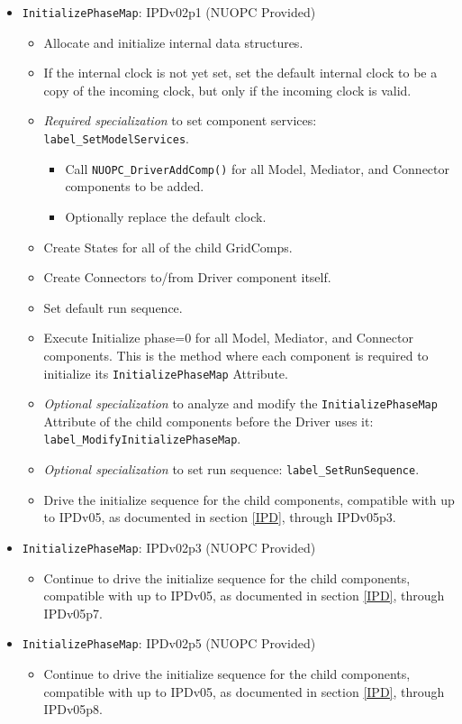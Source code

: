 \begin{itemize}
\item {\tt InitializePhaseMap}: IPDv02p1 ({\sc NUOPC Provided})
  \begin{itemize}
  \item Allocate and initialize internal data structures.
  \item If the internal clock is not yet set, set the default internal clock to be a copy of the incoming clock, but only if the incoming clock is valid.
  \item {\it Required specialization} to set component services: {\tt label\_SetModelServices}.
  \begin{itemize}
    \item Call {\tt NUOPC\_DriverAddComp()} for all Model, Mediator, and Connector components to be added.
    \item Optionally replace the default clock. 
  \end{itemize}
  \item Create States for all of the child GridComps.
  \item Create Connectors to/from Driver component itself.
  \item Set default run sequence.
  \item Execute Initialize phase=0 for all Model, Mediator, and Connector components. This is the method where each component is required to initialize its {\tt InitializePhaseMap} Attribute.
  \item {\it Optional specialization} to analyze and modify the {\tt InitializePhaseMap} Attribute of the child components before the Driver uses it: {\tt label\_ModifyInitializePhaseMap}.
  \item {\it Optional specialization} to set run sequence: {\tt label\_SetRunSequence}.
  \item Drive the initialize sequence for the child components, compatible with up to IPDv05, as documented in section \ref{IPD}, through IPDv05p3.
  \end{itemize}  

\item {\tt InitializePhaseMap}: IPDv02p3 ({\sc NUOPC Provided})
  \begin{itemize}
  \item Continue to drive the initialize sequence for the child components, compatible with up to IPDv05, as documented in section \ref{IPD}, through IPDv05p7.
  \end{itemize}  

\item {\tt InitializePhaseMap}: IPDv02p5 ({\sc NUOPC Provided})
  \begin{itemize}
  \item Continue to drive the initialize sequence for the child components, compatible with up to IPDv05, as documented in section \ref{IPD}, through IPDv05p8.
  \end{itemize}  


\end{itemize}
